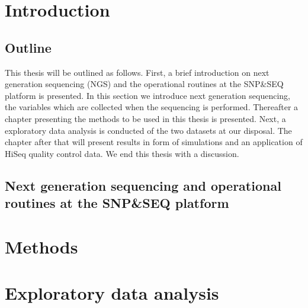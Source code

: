 \documentclass[a4paper,11pt,fleqn,twoside,notitlepage]{report}\usepackage[]{graphicx}\usepackage[]{color}
\makeatletter
\newenvironment{kframe}{%
 \def\at@end@of@kframe{}%
 \ifinner\ifhmode%
  \def\at@end@of@kframe{\end{minipage}}%
  \begin{minipage}{\columnwidth}%
 \fi\fi%
 \def\FrameCommand##1{\hskip\@totalleftmargin \hskip-\fboxsep
 \colorbox{shadecolor}{##1}\hskip-\fboxsep
     \hskip-\linewidth \hskip-\@totalleftmargin \hskip\columnwidth}%
 \MakeFramed {\advance\hsize-\width
   \@totalleftmargin\z@ \linewidth\hsize
   \@setminipage}}%
 {\par\unskip\endMakeFramed%
 \at@end@of@kframe}
\newenvironment{knitrout}{}{} %
\makeatother
\begin{document}
\chapter{Introduction}

\section{Outline}
This thesis will be outlined as follows. First, a brief introduction on next generation sequencing (NGS) and the operational routines at the SNP\&SEQ platform is presented. In this section we introduce next generation sequencing, the variables which are collected when the sequencing is performed. Thereafter a chapter presenting the methods to be used in this thesis is presented. Next, a exploratory data analysis is conducted of the two datasets at our disposal. The chapter after that will present results in form of simulations and an application of HiSeq quality control data. We end this thesis with a discussion.
\section{Next generation sequencing and operational routines at the SNP\&SEQ platform}


\chapter{Methods}


\chapter{Exploratory data analysis}


\begin{knitrout}
\color{fgcolor}\begin{kframe}


{\ttfamily\noindent\color{warningcolor}{\#\# Warning: package 'ggplot2' was built under R version 3.2.4}}

{\ttfamily\noindent\color{warningcolor}{\#\# Warning: replacing previous import by 'grid::arrow' when loading 'GGally'}}

{\ttfamily\noindent\color{warningcolor}{\#\# Warning: replacing previous import by 'grid::unit' when loading 'GGally'}}

{\ttfamily\noindent\color{warningcolor}{\#\# Warning: package 'ggExtra' was built under R version 3.2.5}}\end{kframe}
\end{knitrout}
\end{document}
